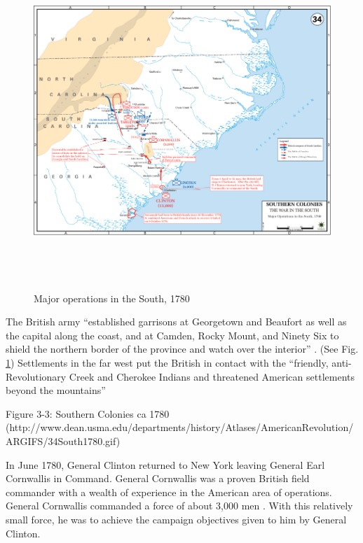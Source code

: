\begin{figure}[ht]
\begin{center}
\includegraphics[height=5in]{gfx/Nicholson3}
\end{center}
\caption{Major operations in the South, 1780 \cite[Map 34]{web:USMA:map34}}
\label{Nicholson3}
\end{figure}

The British army “established garrisons at Georgetown and Beaufort as well as
the capital along the coast, and at Camden, Rocky Mount, and Ninety Six to
shield the northern border of the province and watch over the interior”
\cite[p.10]{weigley_partisan_1970}.  (See Fig. \ref{Nicholson3}) Settlements in
the far west put the British in contact with the “friendly, anti-Revolutionary
Creek and Cherokee Indians and threatened American settlements beyond the
mountains” \cite[p.10]{weigley_partisan_1970}

Figure 3-3: Southern Colonies ca 1780
(http://www.dean.usma.edu/departments/history/Atlases/AmericanRevolution/ARGIFS/34South1780.gif)



In June 1780, General Clinton returned to New York leaving General Earl
Cornwallis in Command.  General Cornwallis was a proven British field commander
with a wealth of experience in the American area of operations.  General
Cornwallis commanded a force of about 3,000 men
\cite[p.51]{woodward_comparative_2002}.  With this
relatively small force, he was to achieve the campaign objectives given to him
by General Clinton.  

